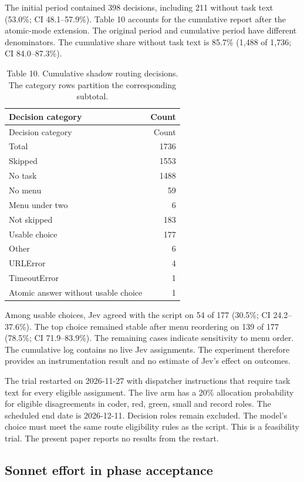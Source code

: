 \documentclass[
  10pt,
  a4paper,
]{article}
\begin{document}
The initial period contained 398 decisions, including 211 without task
text (53.0\%; CI 48.1--57.9\%). Table 10 accounts for the cumulative
report after the atomic-mode extension. The original period and
cumulative period have different denominators. The cumulative share
without task text is 85.7\% (1,488 of 1,736; CI 84.0--87.3\%).

\begin{longtable}[]{@{}lr@{}}
\caption{Table 10. Cumulative shadow routing decisions. The category
rows partition the corresponding subtotal.}\tabularnewline
\toprule\noalign{}
Decision category & Count \\
\midrule\noalign{}
\endfirsthead
\toprule\noalign{}
Decision category & Count \\
\midrule\noalign{}
\endhead
\bottomrule\noalign{}
\endlastfoot
Total & 1736 \\
Skipped & 1553 \\
No task & 1488 \\
No menu & 59 \\
Menu under two & 6 \\
Not skipped & 183 \\
Usable choice & 177 \\
Other & 6 \\
URLError & 4 \\
TimeoutError & 1 \\
Atomic answer without usable choice & 1 \\
\end{longtable}

Among usable choices, Jev agreed with the script on 54 of 177 (30.5\%;
CI 24.2--37.6\%). The top choice remained stable after menu reordering
on 139 of 177 (78.5\%; CI 71.9--83.9\%). The remaining cases indicate
sensitivity to menu order. The cumulative log contains no live Jev
assignments. The experiment therefore provides an instrumentation result
and no estimate of Jev's effect on outcomes.

The trial restarted on 2026-11-27 with dispatcher instructions that
require task text for every eligible assignment. The live arm has a 20\%
allocation probability for eligible disagreements in coder, red, green,
small and record roles. The scheduled end date is 2026-12-11. Decision
roles remain excluded. The model's choice must meet the same route
eligibility rules as the script. This is a feasibility trial. The
present paper reports no results from the restart.

\subsection{Sonnet effort in phase
acceptance}\label{sonnet-effort-in-phase-acceptance}
\end{document}
